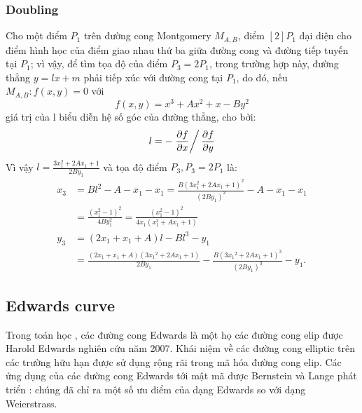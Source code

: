 \documentclass[a4paper,12pt]{report}
\begin{document}
\subsubsection*{Doubling}
Cho một điểm $P_{1}$ trên đường cong Montgomery $M_{A, B}$, điểm $[2]P_1$ đại diện cho điểm hình học của điểm giao nhau thứ ba giữa đường cong và đường tiếp tuyến tại $P_{1}$; vì vậy, để tìm tọa độ của điểm $P_3 = 2P_1$, trong trường hợp này, đường thẳng $y  =  lx  +  m$ phải tiếp xúc với đường cong tại $P_{1}$, do đó, nếu $M_{A, B}: f(x, y) = 0$ với
\begin{displaymath}
f(x, y) = x^3 + Ax^2 + x - By^2
\end{displaymath}
giá trị của l biểu diễn hệ số góc của đường thẳng, cho bởi:
\begin{displaymath}
 l=-\left.\frac{\partial f}{\partial x}\right/\frac{\partial f}{\partial y}
\end{displaymath}
Vì vậy $\displaystyle l = \frac{3x_1^2 + 2Ax_1 + 1}{2By_1}$ và tọa độ điểm $P_3,P_3 = 2P_1$ là:
\begin{displaymath}
{\displaystyle {\begin{aligned}x_{3}&=Bl^{2}-A-x_{1}-x_{1}={\frac {B(3x_{1}^{2}+2Ax_{1}+1)^{2}}{(2By_{1})^{2}}}-A-x_{1}-x_{1}\\&={\frac {(x_{1}^{2}-1)^{2}}{4By_{1}^{2}}}={\frac {(x_{1}^{2}-1)^{2}}{4x_{1}(x_{1}^{2}+Ax_{1}+1)}}\\[8pt]y_{3}&=(2x_{1}+x_{1}+A)l-Bl^{3}-y_{1}\\&={\frac {(2x_{1}+x_{1}+A)(3{x_{1}}^{2}+2Ax_{1}+1)}{2By_{1}}}-{\frac {B(3{x_{1}}^{2}+2Ax_{1}+1)^{3}}{(2By_{1})^{3}}}-y_{1}.\end{aligned}}}
\end{displaymath}
\subsection*{Edwards curve}
Trong toán học , các đường cong Edwards là một họ các đường cong elip được Harold Edwards nghiên cứu năm 2007. Khái niệm về các đường cong elliptic trên các trường hữu hạn được sử dụng rộng rãi trong mã hóa đường cong elip. Các ứng dụng của các đường cong Edwards tới mật mã được Bernstein và Lange phát triển : chúng đã chỉ ra một số ưu điểm của dạng Edwards so với dạng Weierstrass.
\end{document}
